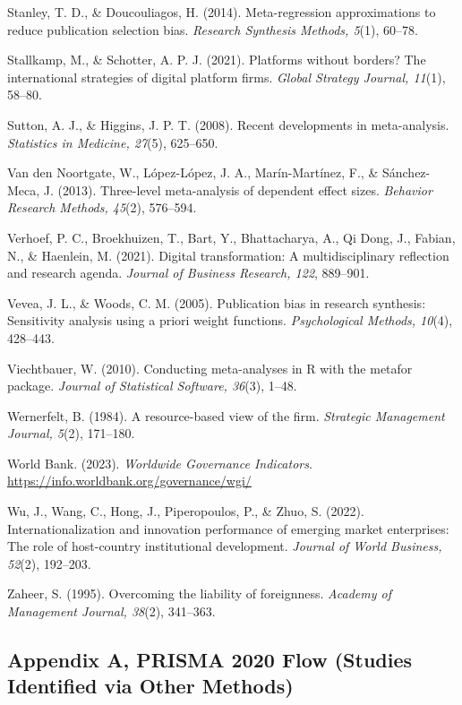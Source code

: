\documentclass[
  12pt,a4paper]{article}
\begin{document}
Stanley, T. D., \& Doucouliagos, H. (2014). Meta-regression
approximations to reduce publication selection bias. \emph{Research
Synthesis Methods, 5}(1), 60--78.

Stallkamp, M., \& Schotter, A. P. J. (2021). Platforms without borders?
The international strategies of digital platform firms. \emph{Global
Strategy Journal, 11}(1), 58--80.

Sutton, A. J., \& Higgins, J. P. T. (2008). Recent developments in
meta-analysis. \emph{Statistics in Medicine, 27}(5), 625--650.

Van den Noortgate, W., López-López, J. A., Marín-Martínez, F., \&
Sánchez-Meca, J. (2013). Three-level meta-analysis of dependent effect
sizes. \emph{Behavior Research Methods, 45}(2), 576--594.

Verhoef, P. C., Broekhuizen, T., Bart, Y., Bhattacharya, A., Qi Dong,
J., Fabian, N., \& Haenlein, M. (2021). Digital transformation: A
multidisciplinary reflection and research agenda. \emph{Journal of
Business Research, 122}, 889--901.

Vevea, J. L., \& Woods, C. M. (2005). Publication bias in research
synthesis: Sensitivity analysis using a priori weight functions.
\emph{Psychological Methods, 10}(4), 428--443.

Viechtbauer, W. (2010). Conducting meta-analyses in R with the metafor
package. \emph{Journal of Statistical Software, 36}(3), 1--48.

Wernerfelt, B. (1984). A resource-based view of the firm.
\emph{Strategic Management Journal, 5}(2), 171--180.

World Bank. (2023). \emph{Worldwide Governance Indicators}.
\url{https://info.worldbank.org/governance/wgi/}

Wu, J., Wang, C., Hong, J., Piperopoulos, P., \& Zhuo, S. (2022).
Internationalization and innovation performance of emerging market
enterprises: The role of host-country institutional development.
\emph{Journal of World Business, 52}(2), 192--203.

Zaheer, S. (1995). Overcoming the liability of foreignness.
\emph{Academy of Management Journal, 38}(2), 341--363.

\hypertarget{appendix-a-prisma-2020-flow-studies-identified-via-other-methods}{%
\subsection{Appendix A, PRISMA 2020 Flow (Studies Identified via Other
Methods)}\label{appendix-a-prisma-2020-flow-studies-identified-via-other-methods}}
\end{document}

